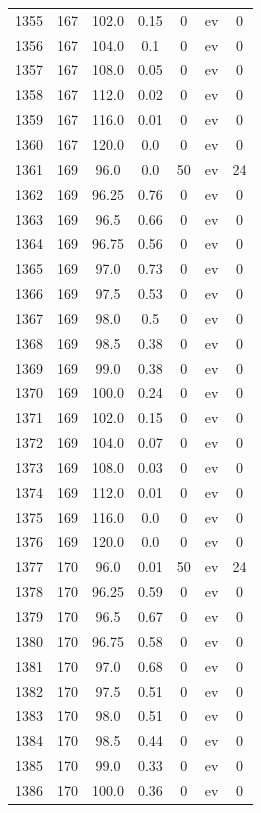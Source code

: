 \documentclass[12pt,a4paper]{article}
\begin{document}
\begin{tabular}{r|cccccc}
	1355 & 167 & 102.0 & 0.15 & 0 & ev & 0 \\
	1356 & 167 & 104.0 & 0.1 & 0 & ev & 0 \\
	1357 & 167 & 108.0 & 0.05 & 0 & ev & 0 \\
	1358 & 167 & 112.0 & 0.02 & 0 & ev & 0 \\
	1359 & 167 & 116.0 & 0.01 & 0 & ev & 0 \\
	1360 & 167 & 120.0 & 0.0 & 0 & ev & 0 \\
	1361 & 169 & 96.0 & 0.0 & 50 & ev & 24 \\
	1362 & 169 & 96.25 & 0.76 & 0 & ev & 0 \\
	1363 & 169 & 96.5 & 0.66 & 0 & ev & 0 \\
	1364 & 169 & 96.75 & 0.56 & 0 & ev & 0 \\
	1365 & 169 & 97.0 & 0.73 & 0 & ev & 0 \\
	1366 & 169 & 97.5 & 0.53 & 0 & ev & 0 \\
	1367 & 169 & 98.0 & 0.5 & 0 & ev & 0 \\
	1368 & 169 & 98.5 & 0.38 & 0 & ev & 0 \\
	1369 & 169 & 99.0 & 0.38 & 0 & ev & 0 \\
	1370 & 169 & 100.0 & 0.24 & 0 & ev & 0 \\
	1371 & 169 & 102.0 & 0.15 & 0 & ev & 0 \\
	1372 & 169 & 104.0 & 0.07 & 0 & ev & 0 \\
	1373 & 169 & 108.0 & 0.03 & 0 & ev & 0 \\
	1374 & 169 & 112.0 & 0.01 & 0 & ev & 0 \\
	1375 & 169 & 116.0 & 0.0 & 0 & ev & 0 \\
	1376 & 169 & 120.0 & 0.0 & 0 & ev & 0 \\
	1377 & 170 & 96.0 & 0.01 & 50 & ev & 24 \\
	1378 & 170 & 96.25 & 0.59 & 0 & ev & 0 \\
	1379 & 170 & 96.5 & 0.67 & 0 & ev & 0 \\
	1380 & 170 & 96.75 & 0.58 & 0 & ev & 0 \\
	1381 & 170 & 97.0 & 0.68 & 0 & ev & 0 \\
	1382 & 170 & 97.5 & 0.51 & 0 & ev & 0 \\
	1383 & 170 & 98.0 & 0.51 & 0 & ev & 0 \\
	1384 & 170 & 98.5 & 0.44 & 0 & ev & 0 \\
	1385 & 170 & 99.0 & 0.33 & 0 & ev & 0 \\
	1386 & 170 & 100.0 & 0.36 & 0 & ev & 0 \\

\end{tabular}
\end{document}
